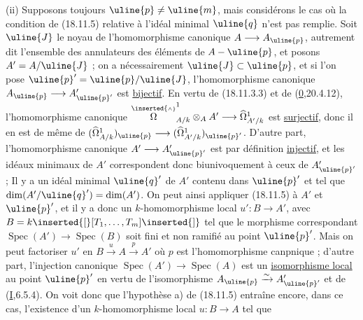 (ii) Supposons toujours $\uline{p}\neq\uline{m}$, mais considérons le cas où la condition de (18.11.5) relative à  l'idéal minimal $\uline{q}$ n'est pas remplie. Soit $\uline{J}$ le noyau de l'homomorphisme canonique $A\longrightarrow A_{\uline{p}}$, autrement dit l'ensemble des annulateurs des éléments de $A-\uline{p}$, et posons $A'=A/\uline{J}$ ; on a nécessairement $\uline{J}\subset\uline{p}$, et si l'on pose $\uline{p}'=\uline{p}/\uline{J}$, l'homomorphisme canonique $A_{\uline{p}}\longrightarrow A'_{\uline{p}'}$ est \uline{bijectif}. En vertu de (18.11.3.3) et de (\uline{0},20.4.12), l'homomorphisme canonique
$\overset{\inserted{\scriptscriptstyle\wedge}}{\Omega}^1_{A/k}\otimes_A A'\longrightarrow\widehat\Omega^1_{A'/k}$ est \uline{surjectif}, donc il en est de même de $(\widehat\Omega^1_{A/k})_{\uline{p}}\longrightarrow(\widehat\Omega^1_{A'/k})_{\uline{p}'}$. D'autre part, l'homomorphisme canonique $A'\longrightarrow A'_{\uline{p}'}$ est par définition \uline{injectif}, et les idéaux  minimaux de $A'$ correspondent donc biunivoquement à ceux de $A'_{\uline{p}'}$ ;  Il y a un idéal minimal $\uline{q}'$ de $A'$  contenu dans  $\uline{p}'$ et tel que $\dim(A'/\uline{q}')=\dim(A')$. On peut ainsi appliquer (18.11.5) à $A'$ et $\uline{p}'$, et il y a donc un $k$-homomorphisme local $u':B\longrightarrow A'$, avec $B=k\inserted{[}[T_1,\ldots,T_m]\inserted{]}$ tel que le morphisme correspondant $\operatorname{Spec}(A')\longrightarrow\operatorname{Spec}(B)$ soit fini et non ramifié au point $\uline{p}'$. Mais on peut factoriser $u'$ en $B\xrightarrow{u}A\xrightarrow{p}A'$ où  $p$ est l'homomorphisme canpnique ; d'autre part, l'injection canonique $\operatorname{Spec}(A')\longrightarrow\operatorname{Spec}(A)$ est un  \uline{isomorphisme local} au point $\uline{p}'$ en vertu de l'isomorphisme $A_{\uline{p}}\xrightarrow{\sim}A'_{\uline{p}'}$ et de (\uline{I},6.5.4). On voit donc que l'hypothèse a) de (18.11.5) entraîne encore, dans ce cas, l'existence d'un $k$-homomorphisme local $u:B\longrightarrow A$ tel que

